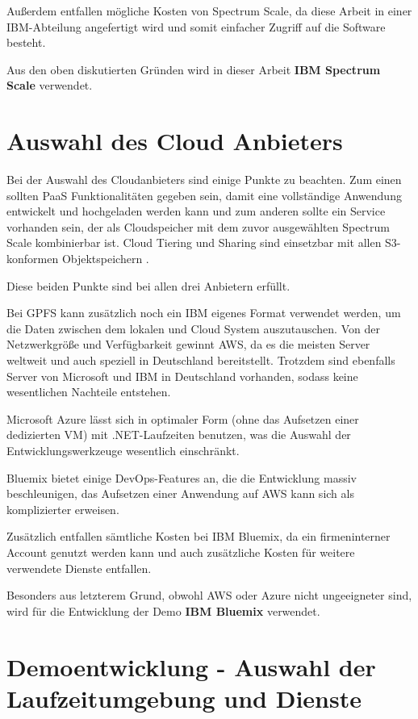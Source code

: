Außerdem entfallen mögliche Kosten von Spectrum Scale, da diese Arbeit in einer IBM-Abteilung angefertigt wird und somit einfacher Zugriff auf die Software besteht.

Aus den oben diskutierten Gründen wird in dieser Arbeit \textbf{IBM Spectrum Scale} verwendet.

\section{Auswahl des Cloud Anbieters}

Bei der Auswahl des Cloudanbieters sind einige Punkte zu beachten. Zum einen sollten \acs{PaaS} Funktionalitäten gegeben sein, damit eine vollständige Anwendung entwickelt und hochgeladen werden kann und zum anderen sollte ein Service vorhanden sein, der als Cloudspeicher mit dem zuvor ausgewählten Spectrum Scale kombinierbar ist.
Cloud Tiering und Sharing sind einsetzbar mit allen S3-konformen Objektspeichern \parencite[S. 110]{ibm.2017}. 

Diese beiden Punkte sind bei allen drei Anbietern erfüllt.

Bei \acs{GPFS} kann zusätzlich noch ein IBM eigenes Format verwendet werden, um die Daten zwischen dem lokalen und Cloud System auszutauschen.
Von der Netzwerkgröße und Verfügbarkeit gewinnt \acs{AWS}, da es die meisten Server weltweit und auch speziell in Deutschland bereitstellt. Trotzdem sind ebenfalls Server von Microsoft und IBM in Deutschland vorhanden, sodass keine wesentlichen Nachteile entstehen.

Microsoft Azure lässt sich in optimaler Form (ohne das Aufsetzen einer dedizierten \acs{VM}) mit .NET-Laufzeiten benutzen, was die Auswahl der Entwicklungswerkzeuge wesentlich einschränkt.

Bluemix bietet einige DevOps-Features an, die die Entwicklung massiv beschleunigen, das Aufsetzen einer Anwendung auf \acs{AWS} kann sich als komplizierter erweisen.

Zusätzlich entfallen sämtliche Kosten bei IBM Bluemix, da ein firmeninterner Account genutzt werden kann und auch zusätzliche Kosten für weitere verwendete Dienste entfallen.

Besonders aus letzterem Grund, obwohl AWS oder Azure nicht ungeeigneter sind, wird für die Entwicklung der Demo \textbf{IBM Bluemix} verwendet.

\section{Demoentwicklung - Auswahl der Laufzeitumgebung und Dienste}


